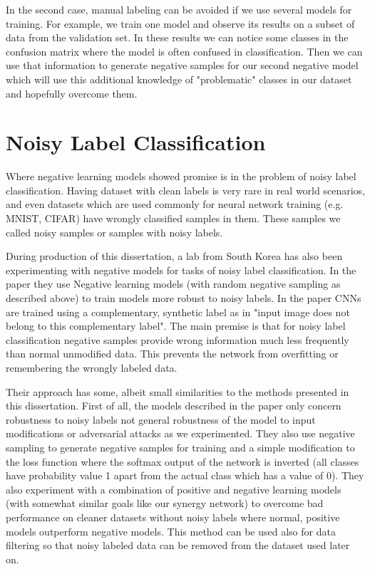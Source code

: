 \documentclass[b5paper]{book}
\begin{document}
In the second case, manual labeling can be avoided if we use several models for training. For example, we train one model and observe its results on a subset of data from the validation set. In these results we can notice some classes in the confusion matrix where the model is often confused in classification. Then we can use that information to generate negative samples for our second negative model which will use this additional knowledge of "problematic" classes in our dataset and hopefully overcome them.

\section{Noisy Label Classification}

Where negative learning models showed promise is in the problem of noisy label classification. Having dataset with clean labels is very rare in real world scenarios, and even datasets which are used commonly for neural network training (e.g. MNIST, CIFAR) have wrongly classified samples in them. These samples we called noisy samples or samples with noisy labels.

During production of this dissertation, a lab from South Korea has also been experimenting with negative models for tasks of noisy label classification. In the paper they use Negative learning models (with random negative sampling as described above) to train models more robust to noisy labels. In the paper CNNs are trained using a complementary, synthetic label as in "input image does not belong to this complementary label". The main premise is that for noisy label classification negative samples provide wrong information much less frequently than normal unmodified data. This prevents the network from overfitting or remembering the wrongly labeled data.

Their approach has some, albeit small similarities to the methods presented in this dissertation. First of all, the models described in the paper only concern robustness to noisy labels not general robustness of the model to input modifications or adversarial attacks as we experimented. They also use negative sampling to generate negative samples for training and a simple modification to the loss function where the softmax output of the network is inverted (all classes have probability value 1 apart from the actual class which has a value of 0). They also experiment with a combination of positive and negative learning models (with somewhat similar goals like our synergy network) to overcome bad performance on cleaner datasets without noisy labels where normal, positive models outperform negative models. This method can be used also for data filtering so that noisy labeled data can be removed from the dataset used later on.
\end{document}
